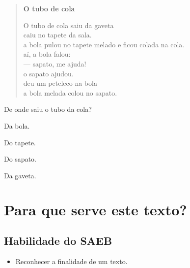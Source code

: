 \begin{myquote}
\begin{verse}
\textbf{O tubo de cola}

O tubo de cola saiu da gaveta\\
caiu no tapete da sala.\\
a bola pulou no tapete melado e ficou colada na cola.\\
aí, a bola falou:\\
--- sapato, me ajuda!\\
o sapato ajudou.\\
deu um peteleco na bola\\
a bola melada colou no sapato.
\end{verse}


\end{myquote}

De onde saiu o tubo da cola?

\begin{escolha}
\item Da bola.

\item Do tapete.

\item Do sapato.

\item Da gaveta.
\end{escolha}

\chapter{Para que serve este texto?}


\section*{Habilidade do SAEB}

\begin{itemize}
\item Reconhecer a finalidade de um texto.
\end{itemize}

